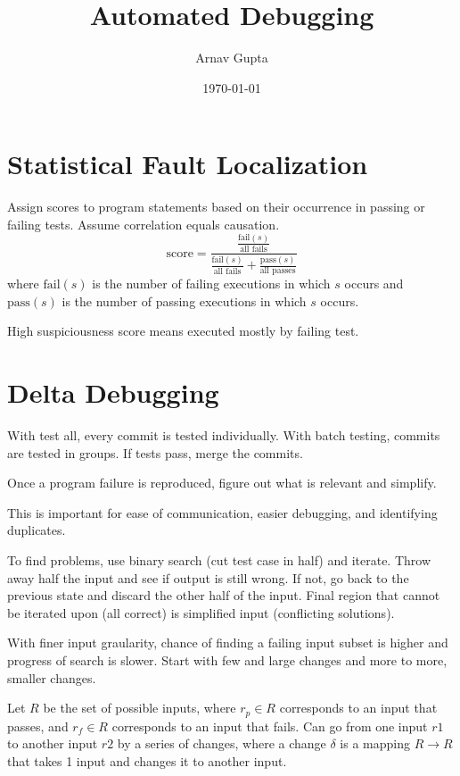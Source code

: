 \documentclass[11pt]{article}
\author{Arnav Gupta}
\date{\today}
\title{Automated Debugging}
\begin{document}
\maketitle
\tableofcontents

\section{Statistical Fault Localization}
\label{sec:org0bb0c4a}
Assign scores to program statements based on their occurrence in passing or failing tests.
Assume correlation equals causation.
$$
\text{score}
= \frac{ \frac{ \text{fail}(s) }{ \text{all fails} } }
{ \frac{ \text{fail}(s) }{ \text{all fails} } + \frac{ \text{pass}(s) }{ \text{all passes} } }
$$
where \(\text{fail}(s)\) is the number of failing executions in which \(s\) occurs and
\(\text{pass}(s)\) is the number of passing executions in which \(s\) occurs.

High suspiciousness score means executed mostly by failing test.
\section{Delta Debugging}
\label{sec:orga82adc8}
With test all, every commit is tested individually.
With batch testing, commits are tested in groups.
If tests pass, merge the commits.

Once a program failure is reproduced, figure out what is relevant and simplify.

This is important for ease of communication, easier debugging, and identifying duplicates.

To find problems, use binary search (cut test case in half) and iterate.
Throw away half the input and see if output is still wrong.
If not, go back to the previous state and discard the other half of the input.
Final region that cannot be iterated upon (all correct) is simplified input
(conflicting solutions).

With finer input graularity, chance of finding a failing input subset is higher and
progress of search is slower.
Start with few and large changes and more to more, smaller changes.

Let \(R\) be the set of possible inputs, where \(r_{p} \in R\) corresponds to an input that passes,
and \(r_{f} \in R\) corresponds to an input that fails.
Can go from one input \(r1\) to another input \(r2\) by a series of changes, where a change \(\delta\)
is a mapping \(R \to R\) that takes 1 input and changes it to another input.
\end{document}
